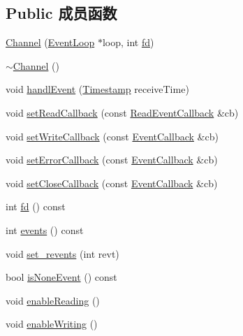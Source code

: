 \subsection*{Public 成员函数}
\begin{DoxyCompactItemize}
\item 
\hyperlink{classmuduo_1_1Channel_a51d49371e765dcf30535b38b68bb80b6}{Channel} (\hyperlink{classmuduo_1_1EventLoop}{Event\+Loop} $\ast$loop, int \hyperlink{classmuduo_1_1Channel_ace5c4071ee8893901bb818bbcab739b2}{fd})
\item 
\hyperlink{classmuduo_1_1Channel_aad279ec58dddf879ac20651fceffd4cf}{$\sim$\+Channel} ()
\item 
void \hyperlink{classmuduo_1_1Channel_a3574bf44b16f2a7e9a172972f5197310}{handl\+Event} (\hyperlink{classmuduo_1_1Timestamp}{Timestamp} receive\+Time)
\item 
void \hyperlink{classmuduo_1_1Channel_a98320338d5a728a36dd017a9c083c129}{set\+Read\+Callback} (const \hyperlink{classmuduo_1_1Channel_a9523d5df2fdb848727cf98870dba0000}{Read\+Event\+Callback} \&cb)
\item 
void \hyperlink{classmuduo_1_1Channel_a907650e3c5c90a771fd1f200aaa3ba8c}{set\+Write\+Callback} (const \hyperlink{classmuduo_1_1Channel_aba4530f63bcce7091a51e66d01f4d2cb}{Event\+Callback} \&cb)
\item 
void \hyperlink{classmuduo_1_1Channel_a79c694fa2b8948df095ae2978ed10cc8}{set\+Error\+Callback} (const \hyperlink{classmuduo_1_1Channel_aba4530f63bcce7091a51e66d01f4d2cb}{Event\+Callback} \&cb)
\item 
void \hyperlink{classmuduo_1_1Channel_af03f5a5224cce590883293ffdf9c88e8}{set\+Close\+Callback} (const \hyperlink{classmuduo_1_1Channel_aba4530f63bcce7091a51e66d01f4d2cb}{Event\+Callback} \&cb)
\item 
int \hyperlink{classmuduo_1_1Channel_ace5c4071ee8893901bb818bbcab739b2}{fd} () const
\item 
int \hyperlink{classmuduo_1_1Channel_ae4f693c8725a3c04d41dee8bb4266f7e}{events} () const
\item 
void \hyperlink{classmuduo_1_1Channel_ac155f87f8dc6f7bdf9559d4d2e5a9a4b}{set\+\_\+revents} (int revt)
\item 
bool \hyperlink{classmuduo_1_1Channel_af586af8cbcc49b563969f6c8356b3c9a}{is\+None\+Event} () const
\item 
void \hyperlink{classmuduo_1_1Channel_ad31f735a6d5ad83203d977ad8eafb223}{enable\+Reading} ()
\item 
void \hyperlink{classmuduo_1_1Channel_af1dff4317f202ed06097a1425a4dca6d}{enable\+Writing} ()

\end{DoxyCompactItemize}
